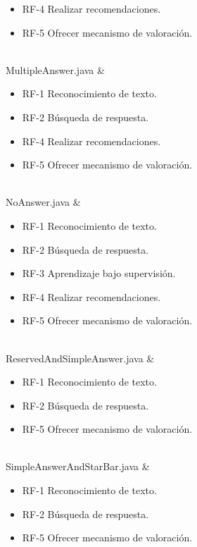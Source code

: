 {\begin{itemize}
 \item RF-4 Realizar recomendaciones.
 \item RF-5 Ofrecer mecanismo de valoración.
 \end{itemize}  				
 \\
 MultipleAnswer.java 		&
 \begin{itemize}
 \item RF-1 Reconocimiento de texto.
 \item RF-2 Búsqueda de respuesta.
 \item RF-4 Realizar recomendaciones.
 \item RF-5 Ofrecer mecanismo de valoración.
 \end{itemize}  				
 \\
 NoAnswer.java 		&
 \begin{itemize}
 	\item RF-1 Reconocimiento de texto.
 	\item RF-2 Búsqueda de respuesta.
 	\item RF-3 Aprendizaje bajo supervisión.
 	\item RF-4 Realizar recomendaciones.
 	\item RF-5 Ofrecer mecanismo de valoración.
 \end{itemize}  				
 \\
 ReservedAndSimpleAnswer.java 		&
 \begin{itemize}
 \item RF-1 Reconocimiento de texto.
 \item RF-2 Búsqueda de respuesta.
 \item RF-5 Ofrecer mecanismo de valoración.
 \end{itemize}  				
 \\
 SimpleAnswerAndStarBar.java 		&
 \begin{itemize}
 \item RF-1 Reconocimiento de texto.
 \item RF-2 Búsqueda de respuesta.
 \item RF-5 Ofrecer mecanismo de valoración.
 \end{itemize}  				
 \\}